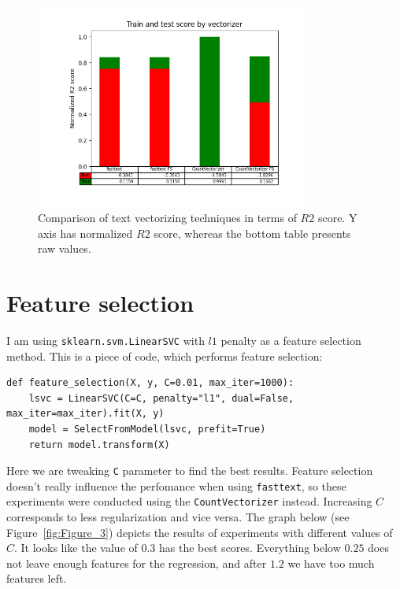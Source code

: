 \documentclass{article}
\begin{document}
\begin{figure}[H]
    \centering
    \includegraphics[width=0.8\textwidth]{Figure_2.png}
    \caption{Comparison of text vectorizing techniques in terms of $R2$ score. Y axis has normalized $R2$ score, 
    whereas the bottom table presents raw values.}\label{fig:Figure_2}
\end{figure}


\section{Feature selection}
I am using \lstinline{sklearn.svm.LinearSVC} with $l1$ penalty as a feature selection method. This is a piece
of code, which performs feature selection:

\begin{lstlisting}
def feature_selection(X, y, C=0.01, max_iter=1000):
    lsvc = LinearSVC(C=C, penalty="l1", dual=False, max_iter=max_iter).fit(X, y)
    model = SelectFromModel(lsvc, prefit=True)
    return model.transform(X)
\end{lstlisting}

Here we are tweaking \lstinline{C} parameter to find the best results. Feature selection
doesn't really influence the perfomance when using \lstinline{fasttext}, so these experiments were conducted using
the \lstinline{CountVectorizer} instead. Increasing $C$
corresponds to less regularization and vice versa. The graph below (see Figure~\ref{fig:Figure_3}) depicts the 
results of experiments with different values of $C$. It looks like the value of $0.3$ has the best scores. Everything
below $0.25$ does not leave enough features for the regression, and after $1.2$ we have too much features left.
\end{document}
